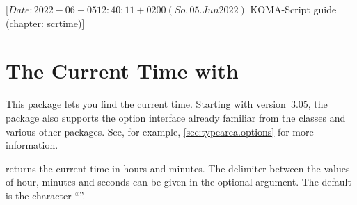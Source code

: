 %
%
%
%
%
%
%

                 [$Date: 2022-06-05 12:40:11 +0200 (So, 05. Jun 2022) $
                  KOMA-Script guide (chapter: scrtime)]

\chapter{The Current Time with }
\BeginIndexGroup
{}

This package lets you find the current time. Starting with version~3.05, the
package also supports the option interface already familiar from the
\KOMAScript{} classes and various other \KOMAScript{} packages. See, for
example, \autoref{sec:typearea.options} for more information.

\begin{Declaration}%
\end{Declaration}%
 returns the current time in hours and minutes.
The delimiter between the values of hour, minutes and seconds can be given in
the optional argument. The default is the character ``\PValue{:}''.

